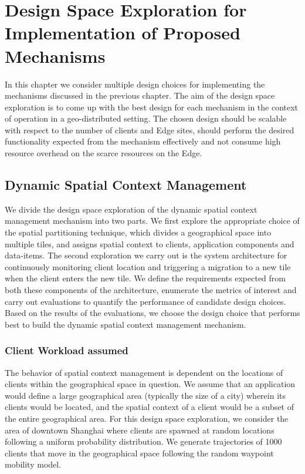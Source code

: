 \chapter{Design Space Exploration for Implementation of Proposed Mechanisms}
\label{sec:design_space_exploration}

In this chapter we consider multiple design choices for implementing the mechanisms discussed in the previous chapter. The aim of the design space exploration is to come up with the best design for each mechanism in the context of operation in a geo-distributed setting. The chosen design should be scalable with respect to the number of clients and Edge sites, should perform the desired functionality expected from the mechanism effectively and not consume high resource overhead on the scarce resources on the Edge.

\section{Dynamic Spatial Context Management}

We divide the design space exploration of the dynamic spatial context management mechanism into two parts. We first explore the appropriate choice of the spatial partitioning technique, which divides a geographical space into multiple tiles, and assigns spatial context to clients, application components and data-items. The second exploration we carry out is the system architecture for continuously monitoring client location and triggering a migration to a new tile when the client enters the new tile. We define the requirements expected from both these components of the architecture, enumerate the metrics of interest and carry out evaluations to quantify the performance of candidate design choices. Based on the results of the evaluations, we choose the design choice that performs best to build the dynamic spatial context management mechanism.

\subsection{Client Workload assumed}
The behavior of spatial context management is dependent on the locations of clients within the geographical space in question. We assume that an application would define a large geographical area (typically the size of a city) wherein its clients would be located, and the spatial context of a client would be a subset of the entire geographical area. For this design space exploration, we consider the area of downtown Shanghai where clients are spawned at random locations following a uniform probability distribution. We generate trajectories of 1000 clients that move in the geographical space following the random waypoint mobility model. 

